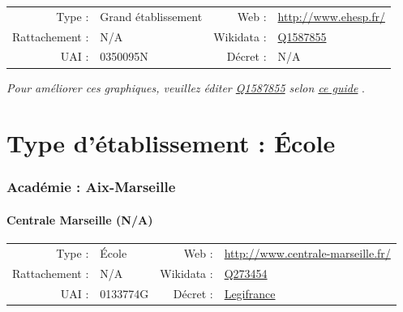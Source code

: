 \documentclass[11pt,french,landscape]{article}
\begin{document}
\begin{tabular*}{0.45\textwidth}{rp{2cm}rl}  
\hline  
Type : & Grand établissement & Web : &\href{http://www.ehesp.fr/}{http://www.ehesp.fr/} \\  
Rattachement : & N/A & Wikidata : & \href{https://www.wikidata.org/entity/Q1587855}{Q1587855} \\  
UAI : & 0350095N & Décret : & N/A \\  
\hline  
\end{tabular*}

\textit{\scriptsize Pour améliorer ces graphiques, veuillez éditer \href{https://www.wikidata.org/entity/Q1587855}{Q1587855}  selon \href{https://github.com/cpesr/wikidataESR/blob/master/Rmd/wikidataESR.md}{ce guide}}
.


\newpage   
\vspace*{5cm}   
\part{Type d'établissement :  École }   
\newpage

\hypertarget{acaduxe9mie-aix-marseille-1}{%
\section{Académie : Aix-Marseille}\label{acaduxe9mie-aix-marseille-1}}

\hypertarget{centrale-marseille-na}{%
\subsection{Centrale Marseille (N/A)}\label{centrale-marseille-na}}

\begin{tabular*}{0.45\textwidth}{rp{2cm}rl}  
\hline  
Type : & École & Web : &\href{http://www.centrale-marseille.fr/}{http://www.centrale-marseille.fr/} \\  
Rattachement : & N/A & Wikidata : & \href{https://www.wikidata.org/entity/Q273454}{Q273454} \\  
UAI : & 0133774G & Décret : & \href{http://www.legifrance.gouv.fr/affichTexte.do?dateTexte=&categorieLien=id&cidTexte=JORFTEXT000000427883&fastPos=1&fastReqId=899520006&oldAction=rechExpTexteJorf}{Legifrance} \\  
\hline  
\end{tabular*}
\end{document}
